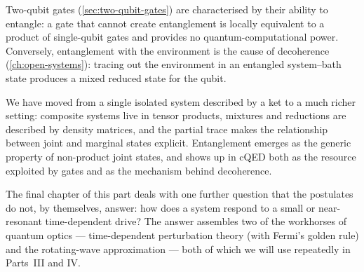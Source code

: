\begin{application}
\label{app:entanglement-cqed}
Two-qubit gates (\cref{sec:two-qubit-gates}) are characterised by
their ability to entangle: a gate that cannot create entanglement is
locally equivalent to a product of single-qubit gates and provides
no quantum-computational power. Conversely, entanglement with the
environment is the cause of decoherence
(\cref{ch:open-systems}): tracing out the environment in an
entangled system--bath state produces a mixed reduced state for the
qubit.
\end{application}

We have moved from a single isolated system described by a ket to
a much richer setting: composite systems live in tensor products,
mixtures and reductions are described by density matrices, and the
partial trace makes the relationship between joint and marginal
states explicit. Entanglement emerges as the generic property of
non-product joint states, and shows up in cQED both as the
resource exploited by gates and as the mechanism behind
decoherence.

The final chapter of this part deals with one further question
that the postulates do not, by themselves, answer: how does a
system respond to a small or near-resonant time-dependent drive?
The answer assembles two of the workhorses of quantum optics ---
time-dependent perturbation theory (with Fermi's golden rule) and
the rotating-wave approximation --- both of which we will use
repeatedly in Parts~III and IV.

